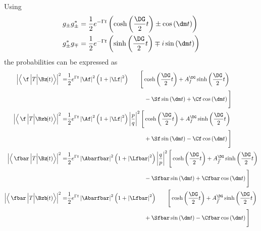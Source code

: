 Using
\begin{align}
g_{\pm}g_{\pm}^{*} &= \frac{1}{2}e^{-\Gamma t}\left(\cosh\left(\frac{\DG}{2}t\right)\pm\cos\left(\dm t\right)\right)\\
g_{\pm}^*g_{\mp} &=  \frac{1}{2}e^{-\Gamma t}\left(\sinh\left(\frac{\DG}{2}t\right)\mp i\sin\left(\dm t\right)\right)
\end{align}
the probabilities can be expressed as
\begin{align}
\left|\left<\,\f\,\Big|T\Big|\Bz\!(t)\right>\right|^2 =&
\frac{1}{2}e^{\Gamma t}\left|\Af\right|^2\left(1+\left|\Lf\right|^2\right)\hphantom{\left|\frac{p}{q}\right|^2}
\Bigg[\cosh\left(\frac{\DG}{2}t\right) + A_f^{\DG}\sinh\left(\frac{\DG}{2}t\right)\nonumber\\
&\hphantom{\frac{1}{2}e^{\Gamma t}\left|\Af\right|^2\left(1+\left|\Lf\right|^2\right)\left|\frac{p}{q}\right|^2\Bigg[}
-\Sf\sin\left(\dm t\right)+\Cf\cos\left(\dm t\right)\Bigg]\\
\left|\left<\,\f\,\Big|T\Big|\Bzb\!(t)\right>\right|^2 =&
\frac{1}{2}e^{\Gamma t}\left|\Af\right|^2\left(1+\left|\Lf\right|^2\right)\left|\frac{p}{q}\right|^2
\Bigg[\cosh\left(\frac{\DG}{2}t\right) + A_f^{\DG}\sinh\left(\frac{\DG}{2}t\right)\nonumber\\
&\hphantom{\frac{1}{2}e^{\Gamma t}\left|\Af\right|^2\left(1+\left|\Lf\right|^2\right)\left|\frac{p}{q}\right|^2\Bigg[}
+\Sf\sin\left(\dm t\right)-\Cf\cos\left(\dm t\right)\Bigg]\\
\left|\left<\,\fbar\,\Big|T\Big|\Bz\!(t)\right>\right|^2 =&
\frac{1}{2}e^{\Gamma t}\left|\Abarfbar\right|^2\left(1+\left|\Lfbar\right|^2\right)\left|\frac{q}{p}\right|^2
\Bigg[\cosh\left(\frac{\DG}{2}t\right) + A_{\kern 1.5pt\overline{\kern -1.5pt f\kern 1.5pt}}^{\DG}\sinh\left(\frac{\DG}{2}t\right)\nonumber\\
&\hphantom{\frac{1}{2}e^{\Gamma t}\left|\Af\right|^2\left(1+\left|\Lf\right|^2\right)\left|\frac{q}{p}\right|^2\Bigg[}
-\Sfbar\sin\left(\dm t\right)+\Cfbar\cos\left(\dm t\right)\Bigg]\\
\left|\left<\,\fbar\,\Big|T\Big|\Bzb\!(t)\right>\right|^2 =&
\frac{1}{2}e^{\Gamma t}\left|\Abarfbar\right|^2\left(1+\left|\Lfbar\right|^2\right)\hphantom{\left|\frac{q}{p}\right|^2}
\Bigg[\cosh\left(\frac{\DG}{2}t\right) + A_{\kern 1.5pt\overline{\kern -1.5pt f\kern 1.5pt}}^{\DG}\sinh\left(\frac{\DG}{2}t\right)\nonumber\\
&\hphantom{\frac{1}{2}e^{\Gamma t}\left|\Af\right|^2\left(1+\left|\Lf\right|^2\right)\left|\frac{q}{p}\right|^2\Bigg[}
+\Sfbar\sin\left(\dm t\right)-\Cfbar\cos\left(\dm t\right)\Bigg]
\end{align}
